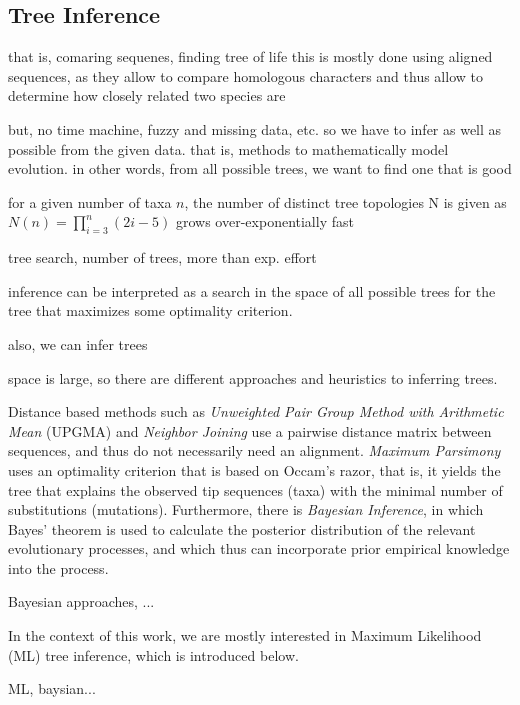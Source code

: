 \subsection{Tree Inference}
\label{ch:Foundations:sec:TreeOfLife:sub:TreeInference}


that is, comaring sequenes, finding tree of life
this is mostly done using aligned sequences, as they allow to compare homologous characters and thus
allow to determine how closely related two species are

but, no time machine, fuzzy and missing data, etc. so we have to infer as well as possible from the given data.
that is, methods to mathematically model evolution.
in other words, from all possible trees, we want to find one that is good

for a given number of taxa $n$, the number of distinct tree topologies N is given as
$N(n) = \prod_{i=3}^{n} (2i - 5)$
grows over-exponentially fast
\cite{Felsenstein2004}

tree search, number of trees, more than exp. effort

inference can be interpreted as a search in the space of all possible trees for the tree that maximizes some optimality criterion.

also, we can infer trees \cite{Felsenstein2004}

\cite{Yang2006}


space is large, so there are different approaches and heuristics to inferring trees.


Distance based methods such as \emph{Unweighted Pair Group Method with Arithmetic Mean} (UPGMA) \cite{Sokal1958}
and \emph{Neighbor Joining} \cite{Saitou1987}
use a pairwise distance matrix between sequences, and thus do not necessarily need an alignment.
\emph{Maximum Parsimony} \cite{Sankoff1975} uses an optimality criterion that is based on Occam's razor,
that is, it yields the tree that explains the observed tip sequences (taxa)
with the minimal number of substitutions (mutations).
Furthermore, there is \emph{Bayesian Inference},
in which Bayes' theorem is used to calculate the posterior distribution of the relevant evolutionary processes,
and which thus can incorporate prior empirical knowledge into the process.

Bayesian approaches, ...

In the context of this work, we are mostly interested in Maximum Likelihood (ML) tree inference,
which is introduced below.

ML, baysian...

